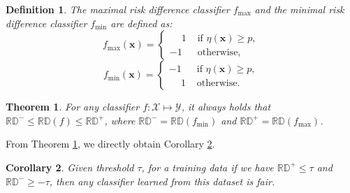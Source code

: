 \documentclass[letterpaper]{article} %
\newcommand{\x}{\mathbf{x}}
\newcommand{\RD}{\mathbb{RD}}
\newtheorem{theorem}{Theorem}
\newtheorem{corollary}[theorem]{Corollary}
\newtheorem{definition}{Definition}
\begin{document}
\begin{definition}
	The maximal risk difference classifier $f_{\max}$  and the minimal risk difference classifier $f_{\min}$ are defined as:
	\begin{equation*}
		f_{\max} (\x)=
		\begin{cases}
			\phantom{-}1 & \text{ if } \eta (\x) \geq p , \\
			-1           & \text{ otherwise, }
		\end{cases}
	\end{equation*}
	\begin{equation*}
		f_{\min} (\x)=
		\begin{cases}
			-1           & \text{ if } \eta (\x) \geq p , \\
			\phantom{-}1 & \text{ otherwise.}
		\end{cases}
	\end{equation*}
	\label{def:mrdc}
\end{definition}

\begin{theorem}
	For any classifier $f \colon \mathcal{X} \mapsto \mathcal{Y}$, it always holds that $\RD^{-} \leq \RD (f) \leq \RD^{+}$, where $\RD^{-} = \RD ( f_{\min} )$ and $\RD^{+} = \RD ( f_{\max} )$.
	\label{thm:mrdc}
\end{theorem}

From Theorem \ref{thm:mrdc}, we directly obtain Corollary \ref{cor:2}.

\begin{corollary}\label{cor:2}
	Given threshold $\tau$, for a training data if we have $\RD^{+}  \leq \tau$ and $\RD^{-}  \geq -\tau$, then any classifier learned from this dataset is fair.
\end{corollary}
\end{document}
